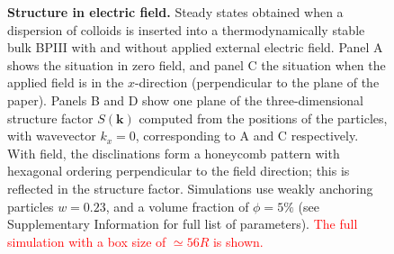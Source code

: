 \documentclass[12pt]{article}
\begin{document}
\begin{figure}
\begin{center}
\end{center}
\caption{\textbf{Structure in electric field.}
Steady states obtained when a dispersion of colloids is inserted
into a thermodynamically stable bulk BPIII with and without applied
external electric field. Panel A shows the situation in zero field, and panel
C the situation when the applied field is in the $x$-direction
(perpendicular to the plane of the paper). Panels B and D show one
plane of the three-dimensional structure factor $S(\mathbf{k})$ computed
from the positions of the particles, with wavevector $k_x = 0$, corresponding
to A and C respectively. With field, the disclinations form a honeycomb
pattern with hexagonal ordering perpendicular to the field direction;
this is reflected in the structure factor.
Simulations use weakly anchoring particles $w=0.23$, and a volume
fraction of $\phi=5\%$ (see Supplementary Information for full list of
parameters).
\textcolor{red}{The full simulation with a box size of $\simeq 56R$ is shown.}}
\end{figure}
\end{document}
